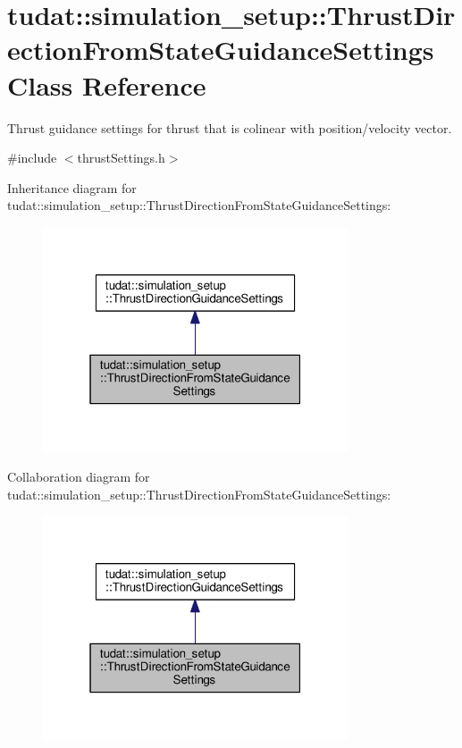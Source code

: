 \hypertarget{classtudat_1_1simulation__setup_1_1ThrustDirectionFromStateGuidanceSettings}{}\section{tudat\+:\+:simulation\+\_\+setup\+:\+:Thrust\+Direction\+From\+State\+Guidance\+Settings Class Reference}
\label{classtudat_1_1simulation__setup_1_1ThrustDirectionFromStateGuidanceSettings}


Thrust guidance settings for thrust that is colinear with position/velocity vector.  




{\ttfamily \#include $<$thrust\+Settings.\+h$>$}



Inheritance diagram for tudat\+:\+:simulation\+\_\+setup\+:\+:Thrust\+Direction\+From\+State\+Guidance\+Settings\+:
\nopagebreak
\begin{figure}[H]
\begin{center}
\leavevmode
\includegraphics[width=256pt]{classtudat_1_1simulation__setup_1_1ThrustDirectionFromStateGuidanceSettings__inherit__graph}
\end{center}
\end{figure}


Collaboration diagram for tudat\+:\+:simulation\+\_\+setup\+:\+:Thrust\+Direction\+From\+State\+Guidance\+Settings\+:
\nopagebreak
\begin{figure}[H]
\begin{center}
\leavevmode
\includegraphics[width=256pt]{classtudat_1_1simulation__setup_1_1ThrustDirectionFromStateGuidanceSettings__coll__graph}
\end{center}
\end{figure}
